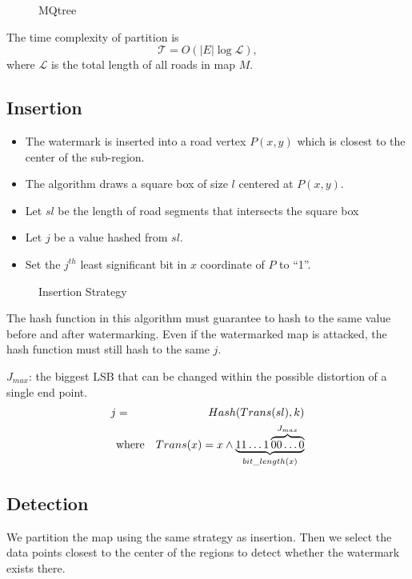 \documentclass[
	paper=128mm:96mm,	%
	fontsize=11pt,					%
	pagesize,							%
	parskip=half-,					%
	numbers=noendperiod,	%
	captions=nooneline			%
	]{scrartcl}							%
\newcommand{\LEN}{\mathcal{L}}
\newcommand{\T}{\mathcal{T}}
\theoremstyle{mythmstyle}
\begin{document}
\clearpage

\begin{figure}[th]
\centering
{}
\caption{MQtree}
\label{fig:quadtree}
\end{figure}
\clearpage
The time complexity of partition is 
\[\T = O(|E|\log\LEN),\]
where $\LEN$ is the total length of all roads in map $M$.
\clearpage

\subsection*{Insertion}
\begin{itemize}
\item The watermark is inserted into a road vertex $P(x, y)$ which is
closest to the center of the sub-region. 

\item The algorithm draws a square box of size $l$ centered at $P(x, y)$. 
\item Let $sl$ be the length of road segments that intersects the square box
\item Let $j$ be a value hashed from $sl$. 
\item Set the $j^{th}$ least significant bit in $x$ coordinate of $P$ to ``1''. 
\end{itemize}
\clearpage

\begin{figure}
\centering
{}
\label{fig:insert}
\caption{Insertion Strategy}
\end{figure} 
\clearpage

The hash function in this algorithm must 
guarantee to hash to the same value before and after watermarking. 
Even if the watermarked map is attacked, the hash function must still hash to the same $j$. 

$J_{max}$: the biggest LSB that can be changed within the possible distortion of a single end point.
\begin{eqnarray*}
j&=&Hash(Trans(sl),k) \\
&\rm{where} & Trans(x)= x \land \underbrace {11\ldots1\overbrace {00\ldots0}^{J_{max}} }_{bit\_length(x)} 
\end{eqnarray*}
\clearpage




\subsection*{Detection}
We partition the map using the same strategy as insertion. Then we select the data points closest
to the center of the regions to detect whether the watermark exists there.
\end{document}
